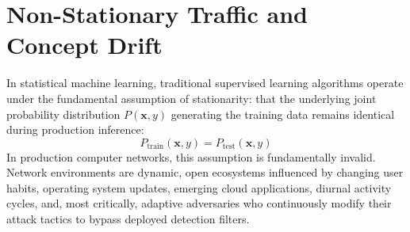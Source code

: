\documentclass[12pt,a4paper,oneside]{report}
\begin{document}
\section{Non-Stationary Traffic and Concept Drift}
In statistical machine learning, traditional supervised learning algorithms operate under the fundamental assumption of stationarity: that the underlying joint probability distribution $P(\mathbf{x}, y)$ generating the training data remains identical during production inference:
\begin{equation}
P_{\text{train}}(\mathbf{x}, y) = P_{\text{test}}(\mathbf{x}, y)
\end{equation}
In production computer networks, this assumption is fundamentally invalid. Network environments are dynamic, open ecosystems influenced by changing user habits, operating system updates, emerging cloud applications, diurnal activity cycles, and, most critically, adaptive adversaries who continuously modify their attack tactics to bypass deployed detection filters.
\end{document}
